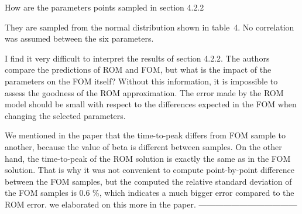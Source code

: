 \documentclass[10pt]{article}
\begin{document}
\begin{response}
 {How are the parameters points sampled in section 4.2.2}
 
 They are sampled from the normal distribution shown in table~4. No correlation was assumed between the six parameters.

\end{response}

\begin{response}
{I find it very difficult to interpret the results of section 4.2.2. The authors compare the predictions of ROM and FOM, but what is the impact of the parameters on the FOM itself? Without this information, it is impossible to assess the goodness of the ROM approximation. The error made by the ROM model should be small with respect to the differences expected in the FOM when changing the selected parameters.}

We mentioned in the paper that the time-to-peak differs from FOM sample to another, 
because the value of beta is different between samples. 
On the other hand, the time-to-peak of the ROM solution is exactly the same as in the FOM solution.
That is why it was not convenient to compute point-by-point difference between the FOM samples, 
but the computed the relative standard deviation of the FOM samples is 0.6 \%, which indicates a much bigger error compared to the ROM error.
we elaborated on this more in the paper.
------------------------------------
\end{response}
\end{document}
